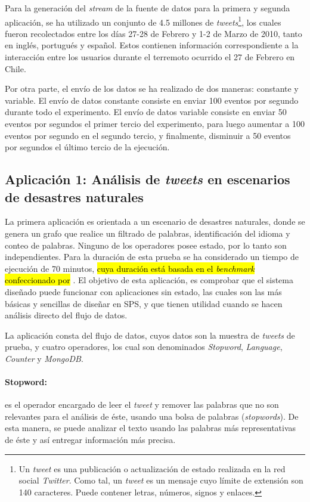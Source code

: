 Para la generación del \textit{stream} de la fuente de datos para la primera y segunda aplicación, se ha utilizado un conjunto de 4.5 millones de \textit{tweets}\footnote{Un \textit{tweet} es una publicación o actualización de estado realizada en la red social \textit{Twitter}. Como tal, un \textit{tweet} es un mensaje cuyo límite de extensión son 140 caracteres. Puede contener letras, números, signos y enlaces.}, los cuales fueron recolectados entre los días 27-28 de Febrero y 1-2 de Marzo de 2010, tanto en inglés, portugués y español. Estos contienen información correspondiente a la interacción entre los usuarios durante el terremoto ocurrido el 27 de Febrero en Chile.

Por otra parte, el envío de los datos se ha realizado de dos maneras: constante y variable. El envío de datos constante consiste en enviar 100 eventos por segundo durante todo el experimento. El envío de datos variable consiste en enviar 50 eventos por segundos el primer tercio del experimento, para luego aumentar a 100 eventos por segundo en el segundo tercio, y finalmente, disminuir a 50 eventos por segundos el último tercio de la ejecución.

\subsection{Aplicación 1: Análisis de \textit{tweets} en escenarios de desastres naturales}
La primera aplicación es orientada a un escenario de desastres naturales, donde se genera un grafo que realice un filtrado de palabras, identificación del idioma y conteo de palabras. Ninguno de los operadores posee estado, por lo tanto son independientes. Para la duración de esta prueba se ha considerado un tiempo de ejecución de 70 minutos, \hl{cuya duración está basada en el \textit{benchmark} confeccionado por} \citep{ArasuCGMMRST04}. El objetivo de esta aplicación, es comprobar que el sistema diseñado puede funcionar con aplicaciones sin estado, las cuales son las más básicas y sencillas de diseñar en SPS, y que tienen utilidad cuando se hacen análisis directo del flujo de datos.

La aplicación consta del flujo de datos, cuyos datos son la muestra de \textit{tweets} de prueba, y cuatro operadores, los cual son denominados \textit{Stopword}, \textit{Language}, \textit{Counter} y \textit{MongoDB}.

\paragraph{Stopword:} es el operador encargado de leer el \textit{tweet} y remover las palabras que no son relevantes para el análisis de éste, usando una bolsa de palabras (\textit{stopwords}). De esta manera, se puede analizar el texto usando las palabras más representativas de éste y así entregar información más precisa.

